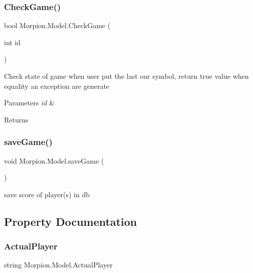 \subsubsection{\texorpdfstring{Check\+Game()}{CheckGame()}}
{\footnotesize\ttfamily bool Morpion.\+Model.\+Check\+Game (\begin{DoxyParamCaption}\item[{int}]{id }\end{DoxyParamCaption})}



Check state of game when user put the last our symbol, return true value when equality an exception are generate 


\begin{DoxyParams}{Parameters}
{\em id} & \\
\hline
\end{DoxyParams}
\begin{DoxyReturn}{Returns}

\end{DoxyReturn}
\mbox{\label{class_morpion_1_1_model_a63707654f2d7d2912d854e5b1f9ced7e}} 
\subsubsection{\texorpdfstring{save\+Game()}{saveGame()}}
{\footnotesize\ttfamily void Morpion.\+Model.\+save\+Game (\begin{DoxyParamCaption}{ }\end{DoxyParamCaption})}



save score of player(s) in db 



\subsection{Property Documentation}
\mbox{\label{class_morpion_1_1_model_adc7a7e85bab1d3a90418792a1e8078cf}} 
\subsubsection{\texorpdfstring{Actual\+Player}{ActualPlayer}}
{\footnotesize\ttfamily string Morpion.\+Model.\+Actual\+Player\hspace{0.3cm}{\ttfamily [get]}}



